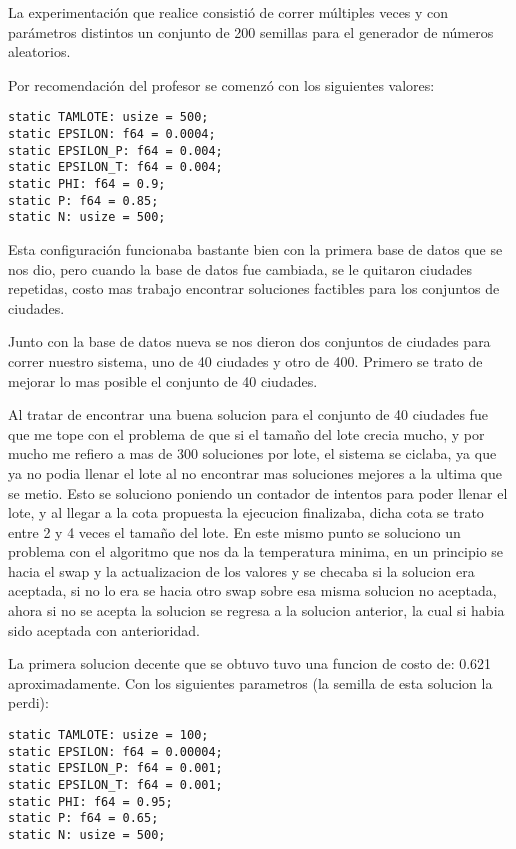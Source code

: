 \documentclass[12pt]{article}
\begin{document}
La experimentación que realice consistió de correr múltiples veces y con parámetros distintos un conjunto de 200 semillas para el generador de números aleatorios.

Por recomendación del profesor se comenzó con los siguientes valores:
\begin{verbatim}
static TAMLOTE: usize = 500;
static EPSILON: f64 = 0.0004;
static EPSILON_P: f64 = 0.004;
static EPSILON_T: f64 = 0.004;
static PHI: f64 = 0.9;
static P: f64 = 0.85;
static N: usize = 500;
\end{verbatim}

Esta configuración funcionaba bastante bien con la primera base de datos que se nos dio, pero cuando la base de datos fue cambiada, se le quitaron ciudades repetidas, costo mas trabajo encontrar soluciones factibles para los conjuntos de ciudades.

Junto con la base de datos nueva se nos dieron dos conjuntos de ciudades para correr nuestro sistema, uno de 40 ciudades y otro de 400. Primero se trato de mejorar lo mas posible el conjunto de 40 ciudades.

Al tratar de encontrar una buena solucion para el conjunto de 40 ciudades fue que me tope con el problema de que si el tamaño del lote crecia mucho, y por mucho me refiero a mas de 300 soluciones por lote, el sistema se ciclaba, ya que ya no podia llenar el lote al no encontrar mas soluciones mejores a la ultima que se metio. Esto se soluciono poniendo un contador de intentos para poder llenar el lote, y al llegar a la cota propuesta la ejecucion finalizaba, dicha cota se trato entre 2 y 4 veces el tamaño del lote. En este mismo punto se soluciono un problema con el algoritmo que nos da la temperatura minima, en un principio se hacia el swap y la actualizacion de los valores y se checaba si la solucion era aceptada, si no lo era se hacia otro swap sobre esa misma solucion no aceptada, ahora si no se acepta la solucion se regresa a la solucion anterior, la cual si habia sido aceptada con anterioridad.

La primera solucion decente que se obtuvo tuvo una funcion de costo de: 0.621 aproximadamente. Con los siguientes parametros (la semilla de esta solucion la perdi):

\begin{verbatim}
static TAMLOTE: usize = 100;
static EPSILON: f64 = 0.00004;
static EPSILON_P: f64 = 0.001;
static EPSILON_T: f64 = 0.001;
static PHI: f64 = 0.95;
static P: f64 = 0.65;
static N: usize = 500;
\end{verbatim}
\end{document}
